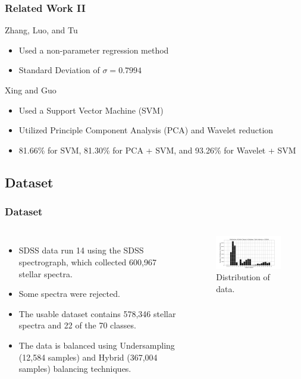 \documentclass[aspectratio=169]{beamer}
\begin{document}
\begin{frame}
\frametitle{Related Work II}
Zhang, Luo, and Tu \cite{Luo}
\begin{itemize}
\item Used a non-parameter regression method
\item Standard Deviation of $\sigma = 0.7994$
\end{itemize}

Xing and Guo \cite{Xing}
\begin{itemize}
\item Used a Support Vector Machine (SVM)
\item Utilized Principle Component Analysis (PCA) and Wavelet reduction
\item 81.66\% for SVM, 81.30\% for PCA + SVM, and 93.26\% for Wavelet + SVM
\end{itemize}
\end{frame}


\subsection{Dataset}
\begin{frame}
\frametitle{Dataset}
  \begin{block}

    \begin{columns}[t]
\vspace{-0.5cm}
	\begin{itemize}
	\item SDSS data run 14 using the SDSS spectrograph, which collected 600,967 stellar spectra. 
	\item Some spectra were rejected.
	\item The usable dataset contains 578,346 stellar spectra and 22 of the 70 classes. 
	\item The data is balanced using Undersampling (12,584 samples) and Hybrid (367,004 samples) balancing techniques. 

	\end{itemize}
        \begin{figure}
 
	\vspace{-0.5cm}
	\hspace*{-.5cm} 
            \centering
            \includegraphics[width = 2.9in]{Distribution_S.png} %
            \caption{Distribution of data.}
            \label{fig:dist1}
        \end{figure}

    \end{columns}
  \end{block}



\end{frame}
\end{document}
